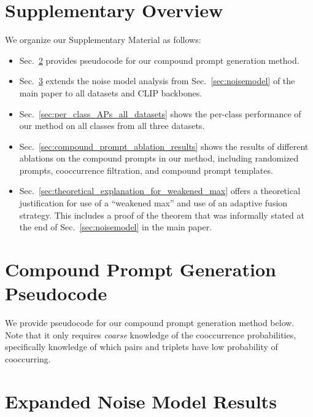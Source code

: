 \clearpage
\setcounter{page}{1}
\maketitlesupplementaryonecolumn

\section{Supplementary Overview}
We organize our Supplementary Material as follows:
\begin{itemize}
    \item Sec.~\ref{sec:compound_prompt_generation_pseudocode} provides pseudocode for our compound prompt generation method.
    \item Sec.~\ref{sec:expanded_noise_model_results} extends the noise model analysis from Sec.~\ref{sec:noisemodel} of the main paper to all datasets and CLIP backbones.
    \item Sec.~\ref{sec:per_class_APs_all_datasets} shows the per-class performance of our method on all classes from all three datasets.
    \item Sec.~\ref{sec:compound_prompt_ablation_results} shows the results of different ablations on the compound prompts in our method, including randomized prompts, cooccurrence filtration, and compound prompt templates.
    \item Sec.~\ref{sec:theoretical_explanation_for_weakened_max} offers a theoretical justification for use of a ``weakened max'' and use of an adaptive fusion strategy. This includes a proof of the theorem that was informally stated at the end of Sec.~\ref{sec:noisemodel} in the main paper.
\end{itemize}

\section{Compound Prompt Generation Pseudocode}
\label{sec:compound_prompt_generation_pseudocode}

We provide pseudocode for our compound prompt generation method below. Note that it only requires \emph{coarse} knowledge of the cooccurrence probabilities, specifically knowledge of which pairs and triplets have low probability of cooccurring.



\section{Expanded Noise Model Results}
\label{sec:expanded_noise_model_results}

